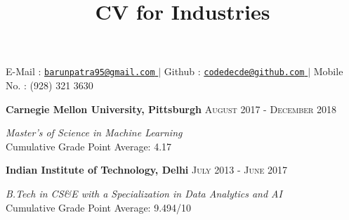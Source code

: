 \documentclass[8pt,a4paper]{article}
\title{CV for Industries}
\begin{document}

\sloppy  %

\begin{center}

\nobreakvspace{0.3em}  %

\noindent E-Mail : \href{mailto:barunpatra95@gmail.com}{ \nolinkurl{barunpatra95@gmail.com} } $\mid$  Github : \href{https://github.com/codedecde}{\nolinkurl{codedecde@github.com} } $\mid$ \noindent Mobile No. : (928) 321 3630
\end{center}
\spacedhrule{0.6em}{-0.4em}  %
\spacedhrule{0.6em}{-0.4em}  %
\headedsection
  {\textbf{Carnegie Mellon University, Pittsburgh}}
  {\textsc{August 2017 - December 2018}} {%
  
    {
    \emph{Master's of Science in Machine Learning} \\
    Cumulative Grade Point Average: 4.17
    }
    
}
\headedsection
  {\textbf{Indian Institute of Technology, Delhi}}
  {\textsc{July 2013 - June 2017}} {%
  
    {
    \emph{B.Tech in CS\&E with a Specialization in Data Analytics and AI} \\
    Cumulative Grade Point Average: 9.494/10
    }
    
}
\end{document}
